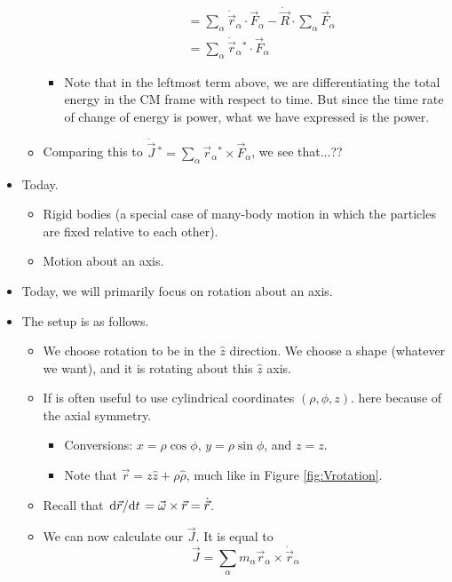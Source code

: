 \documentclass[../notes.tex]{subfiles}
\begin{document}
\begin{itemize}
\begin{itemize}
\begin{itemize}
\begin{align*}
                &= \sum_\alpha\dot{\vec{r}}_\alpha\cdot\vec{F}_\alpha-\dot{\vec{R}}\cdot\sum_\alpha\vec{F}_\alpha\\
                &= \sum_\alpha\dot{\vec{r}}_\alpha{}^*\cdot\vec{F}_\alpha
            \end{align*}
            \item Note that in the leftmost term above, we are differentiating the total energy in the CM frame with respect to time. But since the time rate of change of energy is power, what we have expressed is the power.
        \end{itemize}
        \item Comparing this to $\dot{\vec{J}}{\,}^*=\sum_\alpha\vec{r}_\alpha{}^*\times\vec{F}_\alpha$, we see that...??
    \end{itemize}
    \item Today.
    \begin{itemize}
        \item Rigid bodies (a special case of many-body motion in which the particles are fixed relative to each other).
        \item Motion about an axis.
    \end{itemize}
    \item Today, we will primarily focus on rotation about an axis.
    \item The setup is as follows.
    \begin{itemize}
        \item We choose rotation to be in the $\hat{z}$ direction. We choose a shape (whatever we want), and it is rotating about this $\hat{z}$ axis.
        \item If is often useful to use cylindrical coordinates $(\rho,\phi,z)$. here because of the axial symmetry.
        \begin{itemize}
            \item Conversions: $x=\rho\cos\phi$, $y=\rho\sin\phi$, and $z=z$.
            \item Note that $\vec{r}=z\hat{z}+\rho\hat{\rho}$, much like in Figure \ref{fig:Vrotation}.
        \end{itemize}
        \item Recall that $\dv*{\vec{r}}{t}=\vec{\omega}\times\vec{r}=\dot{\vec{r}}$.
        \item We can now calculate our $\vec{J}$. It is equal to
        \begin{equation*}
            \vec{J} = \sum_\alpha m_\alpha\vec{r}_\alpha\times\dot{\vec{r}}_\alpha

\end{equation*}
\end{itemize}
\end{itemize}
\end{document}

